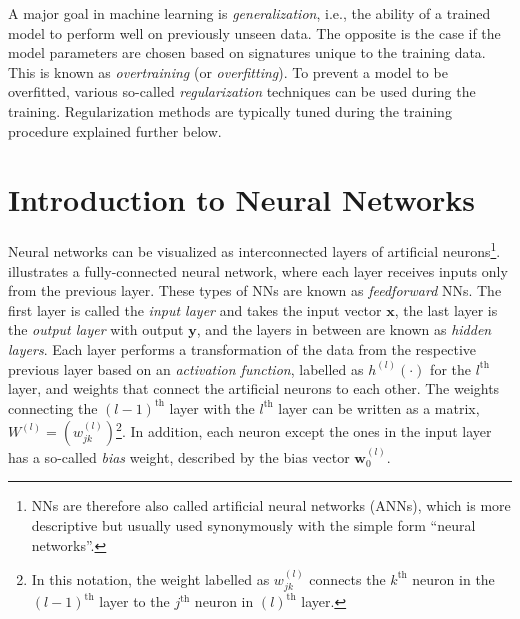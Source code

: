 A major goal in machine learning is \emph{generalization}, i.e., the ability of a trained model to perform well on previously unseen data.
The opposite is the case if the model parameters are chosen based on signatures unique to the training data. This is known as \emph{overtraining} (or \emph{overfitting}). To prevent a model to be overfitted, various so-called \emph{regularization} techniques can be used during the training.
Regularization methods are typically tuned during the training procedure explained further below.


\section{Introduction to Neural Networks}
\label{sec:intro-neural-nets}
Neural networks can be visualized as interconnected layers of artificial neurons\footnote{NNs are therefore also called artificial neural networks (ANNs), which is more descriptive but usually used synonymously with the simple form ``neural networks''.}.  illustrates a fully-connected neural network, where each layer receives inputs only from the previous layer. These types of NNs are known as \emph{feedforward} NNs.
The first layer is called the \emph{input layer} and takes the input vector $\pmb{x}$, the last layer is the \emph{output layer} with output $\pmb{y}$, and the layers in between are known as \emph{hidden layers}. 
Each layer performs a transformation of the data from the respective previous layer based on an \emph{activation function}, labelled as $h^{(l)}(\cdot)$ for the $l^\text{th}$ layer, and weights that connect the artificial neurons to each other. The weights connecting the $(l-1)^{\text{th}}$ layer with the $l^{\text{th}}$ layer can be written as a matrix, $W^{(l)} = \left(w^{(l)}_{jk} \right)$\footnote{In this notation, the weight labelled as $w^{(l)}_{jk}$ connects the $k^\text{th}$ neuron in the $(l-1)^\text{th}$ layer to the $j^\text{th}$ neuron in $(l)^\text{th}$ layer.}. In addition, each neuron except the ones in the input layer has a so-called \emph{bias} weight, described by the bias vector $\pmb{w}^{(l)}_0$.
